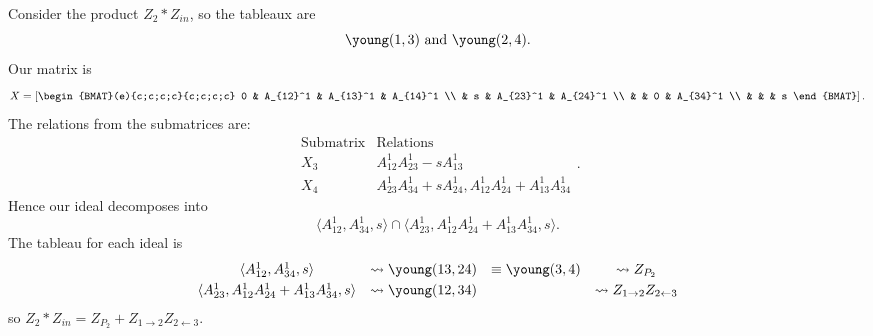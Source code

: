 \documentclass{article} %
\begin{document}
\begin{example}
Consider the product $Z_2 * Z_{in}$, so the tableaux are 
\[
\young(1,3) \text{ and } \young(2,4).
\]
Our matrix is 
\[
X = \left[\begin{BMAT}(e){c;c;c;c}{c;c;c;c}
    0 & A_{12}^1 & A_{13}^1 & A_{14}^1 \\
     & s & A_{23}^1 & A_{24}^1 \\
     & & 0 & A_{34}^1 \\
     & & & s
\end{BMAT}
\right].
\]
The relations from the submatrices are:
\[
\begin{array}{c|c}
    \text{Submatrix} & \text{Relations} \\ \hline
    X_3 & A_{12}^1A_{23}^1 - sA_{13}^1 \\
    X_4 & A_{23}^1A_{34}^1 + sA_{24}^1, A_{12}^1A_{24}^1 + A_{13}^1A_{34}^1
\end{array}.
\]
Hence our ideal decomposes into 
\[
\langle A_{12}^1,A_{34}^1,s \rangle \cap \langle A_{23}^1,A_{12}^1A_{24}^1 + A_{13}^1A_{34}^1,s \rangle.
\]
The tableau for each ideal is
\[\begin{array}{cccc}\vspace{1mm}
    \langle A_{12}^1,A_{34}^1,s \rangle &\leadsto \young(13,24) &\equiv \young(3,4) &\leadsto Z_{P_2} \\ 
    \langle A_{23}^1,A_{12}^1A_{24}^1 + A_{13}^1A_{34}^1,s \rangle &\leadsto \young(12,34) & &\leadsto Z_{1 \rightarrow 2} Z_{2 \leftarrow 3}
\end{array}
\]
so $Z_2 * Z_{in} = Z_{P_2} + Z_{1 \rightarrow 2} Z_{2 \leftarrow 3}$.
\end{example}
\end{document}
